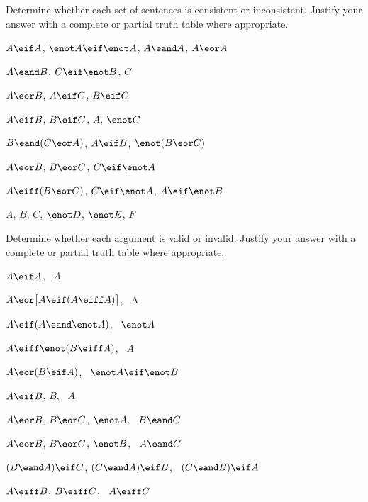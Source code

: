 \solutions
\problempart
\label{pr.TT.consistent}
Determine whether each set of sentences is consistent or inconsistent. Justify your answer with a complete or partial truth table where appropriate.
\begin{earg}
\item $A\eif A$, $\enot A \eif \enot A$, $A\eand A$, $A\eor A$ %
\item $A \eand B$, $C\eif \enot B$, $C$ %
\item $A\eor B$, $A\eif C$, $B\eif C$ %
\item $A\eif B$, $B\eif C$, $A$, $\enot C$ %
\item $B\eand(C\eor A)$, $A\eif B$, $\enot(B\eor C)$  %
\item $A \eor B$, $B\eor C$, $C\eif \enot A$ %
\item $A\eiff(B\eor C)$, $C\eif \enot A$, $A\eif \enot B$ %
\item $A$, $B$, $C$, $\enot D$, $\enot E$, $F$ %
\end{earg}

\solutions
\problempart
\label{pr.TT.valid}
Determine whether each argument is valid or invalid. Justify your answer with a complete or partial truth table where appropriate.
\begin{earg}
\item $A\eif A$, \therefore\ $A$ %
\item $A\eor\bigl[A\eif(A\eiff A)\bigr]$, \therefore\ A %
\item $A\eif(A\eand\enot A)$, \therefore\ $\enot A$ %
\item $A\eiff\enot(B\eiff A)$, \therefore\ $A$ %
\item $A\eor(B\eif A)$, \therefore\ $\enot A \eif \enot B$ %
\item $A\eif B$, $B$, \therefore\ $A$ %
\item $A\eor B$, $B\eor C$, $\enot A$, \therefore\ $B \eand C$ %
\item $A\eor B$, $B\eor C$, $\enot B$, \therefore\ $A \eand C$ %
\item $(B\eand A)\eif C$, $(C\eand A)\eif B$, \therefore\ $(C\eand B)\eif A$ %
\item $A\eiff B$, $B\eiff C$, \therefore\ $A\eiff C$ %
\end{earg}

